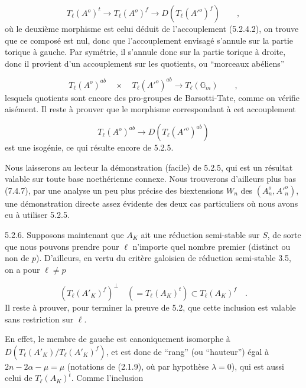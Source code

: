 \begin{equation*}
T_\ell(A^o)^t \longrightarrow T_\ell(A^o)^f \longrightarrow D(T_\ell({A'}^o)^f) \qquad ,
\end{equation*}
où le deuxième morphisme est celui déduit de l'accouplement (5.2.4.2), on trouve que ce composé est nul, donc que l'accouplement envisagé s'annule sur la partie torique à gauche. Par symétrie, il s'annule donc sur la partie torique à droite, donc il provient d'un accouplement sur les quotients, ou ``morceaux abéliens''

\begin{equation*}
T_\ell(A^o)^{ab} \quad \times \quad T_\ell({A'}^o)^{ab} \longrightarrow T_\ell(\mathbb{G}_m) \qquad ,
\end{equation*}
lesquels quotients sont encore des pro-groupes de Barsotti-Tate, comme on vérifie aisément. Il reste à prouver que le morphisme correspondant à cet accouplement

\begin{equation*}
T_\ell(A^o)^{ab} \longrightarrow D(T_\ell({A'}^o)^{ab})
\end{equation*}
est une isogénie, ce qui résulte encore de 5.2.5.

Nous laisserons au lecteur la démonstration (facile) de 5.2.5, qui est un résultat valable sur toute base noethérienne connexe. Nous trouverons d'ailleurs plus bas (7.4.7), par une analyse un peu plus précise des biextensions $W_n$ des $(A_n^{o},{A'}_n^{o})$, une démonstration directe assez évidente des deux cas particuliers où nous avons eu à utiliser 5.2.5.



5.2.6. Supposons maintenant que $A_K$ ait une réduction semi-stable sur $S$, de sorte que nous pouvons prendre pour $\ell$ n'importe quel nombre premier (distinct ou non de $p$). D'ailleurs, en vertu du critère galoisien de réduction semi-stable 3.5, on a pour $\ell \neq p$

\begin{equation}\tag{5.2.7}
(T_\ell(A'_K)^f)^\perp \quad (= T_\ell(A_K)^t) \subset T_\ell(A_K)^f \quad .
\end{equation}
Il reste à prouver, pour terminer la preuve de 5.2, que cette inclusion est valable sans restriction sur $\ell$.

En effet, le membre de gauche est canoniquement isomorphe à $D(T_\ell(A'_K)/T_\ell(A'_K)^f)$, et est donc de ``rang'' (ou ``hauteur'') égal à $2n - 2\alpha - \mu = \mu$ (notations de (2.1.9), où par hypothèse $\lambda = 0$), qui est aussi celui de $T_\ell(A_K)^t$. Comme l'inclusion

